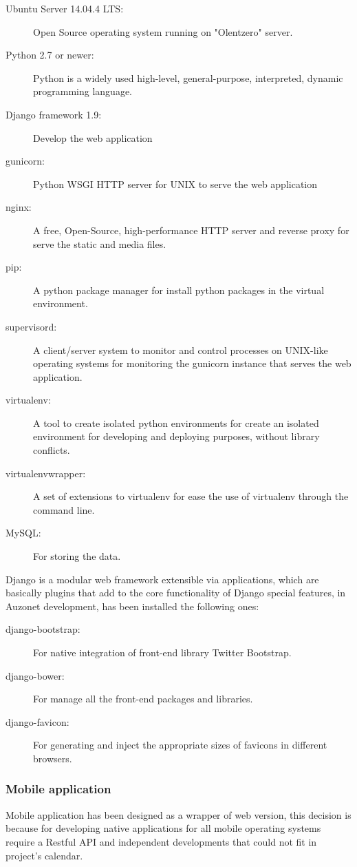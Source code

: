 \documentclass{DeustoFDP}
\begin{document}
\begin{description}
	\item[Ubuntu Server 14.04.4 LTS:] Open Source operating system running on "Olentzero" server.
	\item[Python 2.7 or newer:] Python is a widely used high-level, general-purpose, interpreted, dynamic programming language.
	\item[Django framework 1.9:] Develop the web application
	\item[gunicorn:] Python WSGI HTTP server for UNIX to serve the web application
	\item[nginx:] A free, Open-Source, high-performance HTTP server and reverse proxy for serve the static and media files.
	\item[pip:] A python package manager for install python packages in the virtual environment.
	\item[supervisord:] A client/server system to monitor and control processes on UNIX-like operating systems for monitoring the gunicorn instance that serves the web application.
	\item[virtualenv:] A tool to create isolated python environments for create an isolated environment for developing and deploying purposes, without library conflicts.
	\item[virtualenvwrapper:] A set of extensions to virtualenv for ease the use of virtualenv through the command line.
	\item[MySQL:] For storing the data.
\end{description}

Django is a modular web framework extensible via applications, which are basically plugins that add to the core functionality of Django special features, in Auzonet development, has been installed the following ones:

\begin{description}
	\item[django-bootstrap:] For native integration of front-end library Twitter Bootstrap.
	\item[django-bower:] For manage all the front-end packages and libraries.
	\item[django-favicon:] For generating and inject the appropriate sizes of favicons in different browsers. 
\end{description}

\subsubsection{Mobile application}
Mobile application has been designed as a wrapper of web version, this decision is because for developing native applications for all mobile operating systems require a Restful API and independent developments that could not fit in project's calendar.
\end{document}

